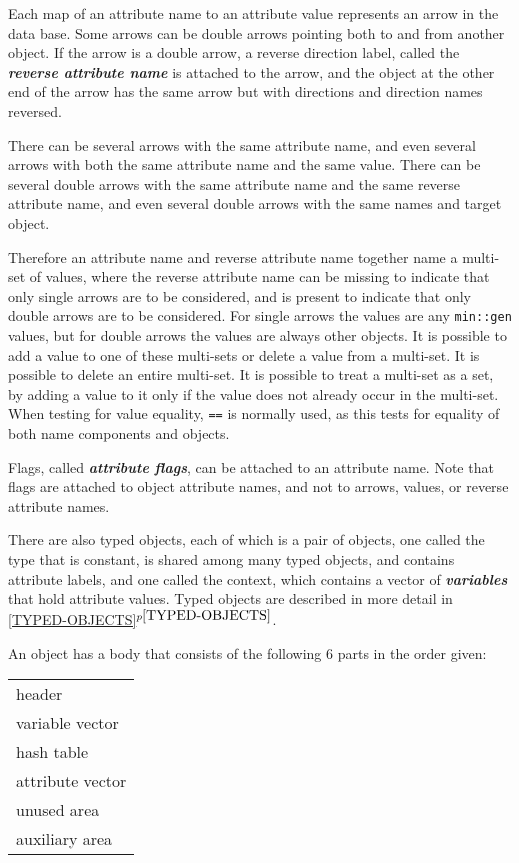 \documentclass[12pt]{article}
\newcommand{\key}[1]{{\bf \em #1}\index{#1}}
\newcommand{\skey}[2]{{\bf \em #1#2}\index{#1}}
\newcommand{\itemref}[1]{\ref{#1}$^{p\pageref{#1}}$}
\begin{document}
Each map of an attribute name to an attribute value represents an
arrow in the data base.  Some arrows can be double arrows pointing
both to and from another object.
If the arrow is a double arrow,
a reverse direction label, called the \key{reverse attribute name}
is attached to the arrow, and the object at the other end of the
arrow has the same arrow but with directions and direction names reversed.

There can be several arrows with the same attribute name,
and even several arrows with both the same attribute name and the
same value.
There can be several double arrows with the same attribute name and
the same reverse attribute name, and even several double arrows with
the same names and target object.

Therefore an attribute name and reverse attribute name together name a
multi-set of values, where the reverse attribute name can be missing to
indicate that only single arrows are to be considered, and is present to
indicate that only double arrows are to be considered.
For single arrows the values are any \verb|min::gen| values, but for
double arrows the values are always other objects.
It is possible to add a value to one of these multi-sets
or delete a value from a
multi-set.  It is possible to delete an entire multi-set.
It is possible to treat a multi-set as a set, by adding a value
to it only if the value does not already occur in the multi-set.
When testing for value equality, {\tt ==} is normally used, as this tests for
equality of both name components and objects.

Flags, called \key{attribute flags}, can be attached to an attribute name.
Note that flags are attached to object attribute names, and not to arrows,
values, or reverse attribute names.

There are also typed objects, each of which is a pair of objects,
one called the type that is constant, is shared among many typed objects,
and contains attribute labels, and one called the
context, which contains a vector of \skey{variable}s that hold attribute
values.  Typed objects are described in more detail in
\itemref{TYPED-OBJECTS}.

An object has a body that consists of the following 6 parts in
the order given:

\begin{center}
\begin{tabular}{l}
header \\
variable vector \\
hash table \\
attribute vector \\
unused area\\
auxiliary area
\end{tabular}
\end{center}
\end{document}
